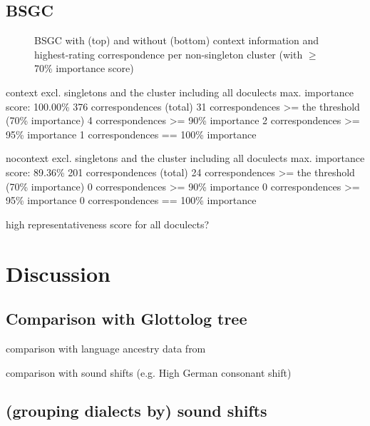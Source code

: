 \documentclass[a4paper]{article}
\begin{document}
\subsection{BSGC}

\begin{figure}
  \centering
  
  
  \vspace{2em}
  
  
  \caption{BSGC with (top) and without (bottom) context information and highest-rating correspondence per non-singleton cluster (with $\geq$70\% importance score)}
  \label{fig:bsgc-trees}
\end{figure}

context
excl. singletons and the cluster including all doculects
max. importance score: 100.00\%
376 correspondences (total)
31 correspondences >= the threshold (70\% importance)
4 correspondences >= 90\% importance
2 correspondences >= 95\% importance
1 correspondences == 100\% importance

nocontext
excl. singletons and the cluster including all doculects
max. importance score: 89.36\%
201 correspondences (total)
24 correspondences >= the threshold (70\% importance)
0 correspondences >= 90\% importance
0 correspondences >= 95\% importance
0 correspondences == 100\% importance



high representativeness score for all doculects?


\newpage
\section{Discussion}


\subsection{Comparison with Glottolog tree}
comparison with language ancestry data from \citet{hammarstrom2018glottolog}

comparison with sound shifts (e.g. High German consonant shift)

\subsection{(grouping dialects by) sound shifts}
\end{document}
